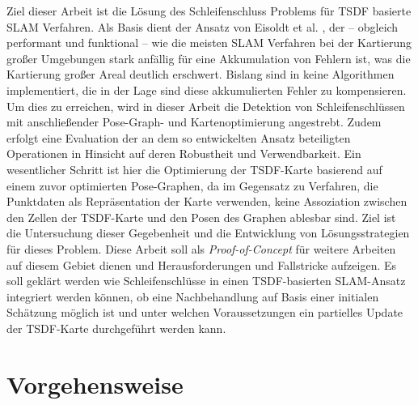 Ziel dieser Arbeit ist die Lösung des Schleifenschluss Problems für TSDF basierte SLAM Verfahren.
Als Basis dient der Ansatz von Eisoldt et al. \cite{HATSDF}, der -- obgleich performant und funktional -- wie die meisten SLAM Verfahren bei der Kartierung großer Umgebungen stark anfällig für eine Akkumulation von Fehlern ist, was die Kartierung großer Areal deutlich erschwert. Bislang sind in \citep{HATSDF} keine Algorithmen implementiert, die in der Lage sind diese akkumulierten Fehler zu kompensieren. Um dies zu erreichen, wird in dieser Arbeit die Detektion von Schleifenschlüssen mit anschließender Pose-Graph- und Kartenoptimierung angestrebt. Zudem erfolgt eine Evaluation der an dem so entwickelten Ansatz beteiligten Operationen in Hinsicht auf deren Robustheit und Verwendbarkeit. Ein wesentlicher Schritt ist hier die Optimierung der TSDF-Karte basierend auf einem zuvor optimierten Pose-Graphen, da im Gegensatz zu Verfahren, die Punktdaten als Repräsentation der Karte verwenden, keine Assoziation zwischen den Zellen der TSDF-Karte und den Posen des Graphen ablesbar sind. Ziel ist die Untersuchung dieser Gegebenheit und die Entwicklung von Lösungsstrategien für dieses Problem. Diese Arbeit soll als \emph{Proof-of-Concept} für weitere Arbeiten auf diesem Gebiet dienen und Herausforderungen und Fallstricke aufzeigen. Es soll geklärt werden wie Schleifenschlüsse in einen TSDF-basierten SLAM-Ansatz integriert werden können, ob eine Nachbehandlung auf Basis einer initialen Schätzung möglich ist und unter welchen Voraussetzungen ein partielles Update der TSDF-Karte durchgeführt werden kann.

\section{Vorgehensweise}
\label{section:herangehensweise}

